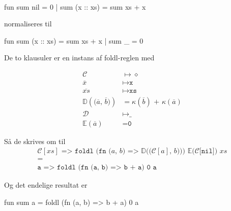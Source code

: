\begin{example}\
  \label{ex:fold-instance-sum}\\
\begin{sml}
fun sum nil       = 0
  | sum (x :: xs) = sum xs + x
\end{sml}

normaliseres til

\begin{sml}
fun sum (x :: xs) = sum xs + x
  | sum _         = 0
\end{sml}

De to klausuler er en instans af \textsf{foldl}-reglen med

\begin{eqnarray*}[rl]
  \mathcal{C} &\mapsto \diamond\\
  \overline{x} &\mapsto \texttt{x}\\
  \overline{xs} &\mapsto \texttt{xs}\\
  \mathbb{D}(\texttt{($\overline{a}$, $\overline{b}$)}) &=
  \kappa(\overline{b}) \texttt{ + } \kappa(\overline{a})\\
  \mathcal{D} &\mapsto \texttt{\_}\\
  \mathbb{E}(\overline{a}) &= \texttt{0}
\end{eqnarray*}

Så de skrives om til
  \begin{eqnarray*}[c]
    \texttt{$\mathcal{C}[xs]$ => foldl (fn ($a$, $b$) =>
      $\mathbb{D}($($\mathcal{C}[a]$, $b$)$)$) $\mathbb{E}(\mathcal{C}[$nil$])$
      $xs$}\\
    =\\
    \texttt{a => foldl (fn (a, b) => b + a) 0 a}
  \end{eqnarray*}

Og det endelige resultat er

\begin{sml}
fun sum a = foldl (fn (a, b) => b + a) 0 a
\end{sml}
  
\end{example}

